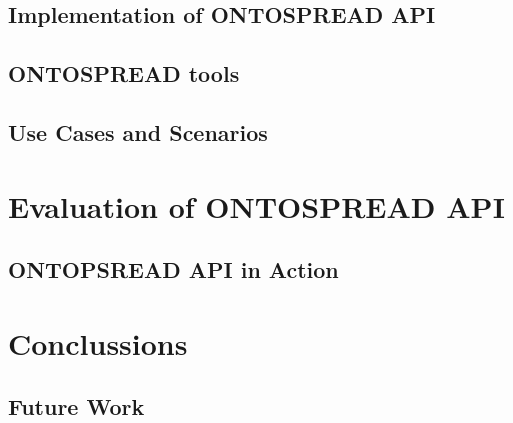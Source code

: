\documentclass{llncs}
\begin{document}
\subsection{Implementation of ONTOSPREAD API}
\subsection{ONTOSPREAD tools}
\subsection{Use Cases and Scenarios}
\section{Evaluation of ONTOSPREAD API}
\subsection{ONTOPSREAD API in Action}
\section{Conclussions}
\subsection{Future Work}
\end{document}
